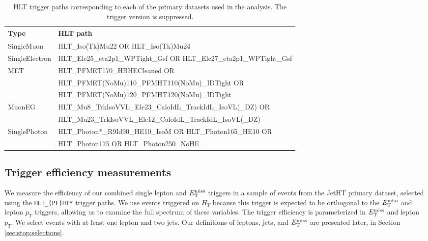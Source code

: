 \begin{table}[htb]
\caption{HLT trigger paths corresponding to each of the primary
  datasets used in the analysis. The trigger version is suppressed.}
\label{tab:stop:trigs}
\centering
\footnotesize
\begin{tabular}{|l|l|}
\hline
Type & HLT path \\
\hline
SingleMuon & HLT\_Iso(Tk)Mu22 OR HLT\_Iso(Tk)Mu24 \\
SingleElectron & HLT\_Ele25\_eta2p1\_WPTight\_Gsf OR HLT\_Ele27\_eta2p1\_WPTight\_Gsf \\
\hline
\multirow{3}{*}{MET} & HLT\_PFMET170\_HBHECleaned OR \\
 & HLT\_PFMET(NoMu)110\_PFMHT110(NoMu)\_IDTight OR \\
 & HLT\_PFMET(NoMu)120\_PFMHT120(NoMu)\_IDTight \\
\hline
\hline
\multirow{2}{*}{MuonEG} & HLT\_Mu8\_TrkIsoVVL\_Ele23\_CaloIdL\_TrackIdL\_IsoVL(\_DZ) OR \\
 & HLT\_Mu23\_TrkIsoVVL\_Ele12\_CaloIdL\_TrackIdL\_IsoVL(\_DZ) \\
\hline
\multirow{2}{*}{SinglePhoton} & HLT\_Photon*\_R9Id90\_HE10\_IsoM OR HLT\_Photon165\_HE10 OR \\
 & HLT\_Photon175 OR HLT\_Photon250\_NoHE \\
\hline
\end{tabular}
\end{table}

\subsection{Trigger efficiency measurements}
\label{ssec:stop:trigeff}

We measure the efficiency of our combined single lepton and $E_\text{T}^\text{miss}$
triggers in a sample of events from the JetHT primary dataset,
selected using the \verb+HLT_(PF)HT*+ trigger paths. We use events
triggered on $H_T$ because this trigger is expected to be orthogonal
to the $E_\text{T}^\text{miss}$ and lepton $p_T$ triggers, allowing us to examine the full %
spectrum of these variables. The trigger
efficiency is parameterized in $E_\text{T}^\text{miss}$ and lepton $p_T$. We select events
with at least one lepton and two jets. Our definitions of leptons,
jets, and $E_\text{T}^\text{miss}$ are presented later, in Section
\ref{sec:stop:selections}.

